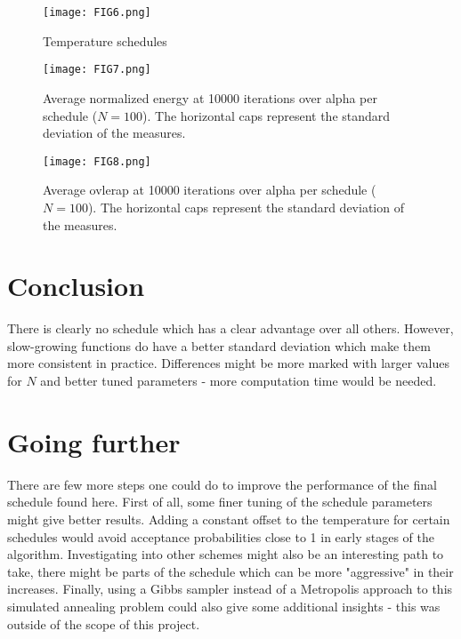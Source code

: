 \documentclass[a4paper]{article}
\begin{document}
\begin{figure}
\centering
\texttt{[image: FIG6.png]}
\caption{\label{fig:FIG6}Temperature schedules}
\end{figure}

\begin{figure}
\centering
\texttt{[image: FIG7.png]}
\caption{\label{fig:FIG7}Average normalized energy at 10000 iterations over alpha per schedule ($N = 100$). The horizontal caps represent the standard deviation of the measures.}
\end{figure}
\begin{figure}
\centering
\texttt{[image: FIG8.png]}
\caption{\label{fig:FIG8}Average ovlerap at 10000 iterations over alpha per schedule ($N = 100$). The horizontal caps represent the standard deviation of the measures.}
\end{figure}

\section{Conclusion}
There is clearly no schedule which has a clear advantage over all others. However, slow-growing functions do have a better standard deviation which make them more consistent in practice. Differences might be more marked with larger values for $N$ and better tuned parameters - more computation time would be needed.

\section{Going further}
There are few more steps one could do to improve the performance of the final schedule found here. First of all, some finer tuning of the schedule parameters might give better results. Adding a constant offset to the temperature for certain schedules would avoid acceptance probabilities close to 1 in early stages of the algorithm. Investigating into other schemes might also be an interesting path to take, there might be parts of the schedule which can be more "aggressive" in their increases. Finally, using a Gibbs sampler instead of a Metropolis approach to this simulated annealing problem could also give some additional insights - this was outside of the scope of this project.
\end{document}
